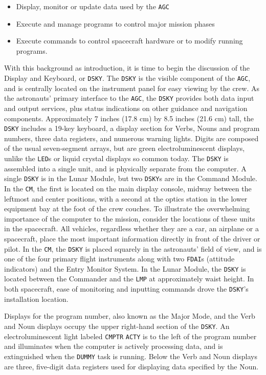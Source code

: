 \documentclass[refcap, oxford]{ahsan}
\begin{document}
\begin{itemize}
  \item Display, monitor or update data used by the \texttt{AGC}
  \item Execute and manage programs to control major mission phases
  \item Execute commands to control spacecraft hardware or to modify running programs.
\end{itemize}

With this background as introduction, it is time to begin the discussion of the Display and Keyboard, or \texttt{DSKY}. The \texttt{DSKY} is the visible component of the \texttt{AGC}, and is centrally located on the instrument panel for easy viewing by the crew. As the astronauts' primary interface to the \texttt{AGC}, the \texttt{DSKY} provides both data input and output services, plus status indications on other guidance and navigation components. Approximately 7 inches (17.8 cm) by 8.5 inches (21.6 cm) tall, the \texttt{DSKY} includes a 19-key keyboard, a display section for Verbs, Nouns and program numbers, three data registers, and numerous warning lights. Digits are composed of the usual seven-segment arrays, but are green electroluminescent displays, unlike the \texttt{LED}s or liquid crystal displays so common today. The \texttt{DSKY} is assembled into a single unit, and is physically separate from the computer. A single \texttt{DSKY} is in the Lunar Module, but two \texttt{DSKY}s are in the Command Module. In the \texttt{CM}, the first is located on the main display console, midway between the leftmost and center positions, with a second at the optics station in the lower equipment bay at the foot of the crew couches. To illustrate the overwhelming importance of the computer to the mission, consider the locations of these units in the spacecraft. All vehicles, regardless whether they are a car, an airplane or a spacecraft, place the most important information directly in front of the driver or pilot. In the \texttt{CM}, the \texttt{DSKY} is placed squarely in the astronauts' field of view, and is one of the four primary flight instruments along with two \texttt{FDAI}s (attitude indicators) and the Entry Monitor System. In the Lunar Module, the \texttt{DSKY} is located between the Commander and the \texttt{LMP} at approximately waist height. In both spacecraft, ease of monitoring and inputting commands drove the \texttt{DSKY}'s installation location.

Displays for the program number, also known as the Major Mode, and the Verb and Noun displays occupy the upper right-hand section of the \texttt{DSKY}. An electroluminescent light labeled \texttt{CMPTR} \texttt{ACTY} is to the left of the program number and illuminates when the computer is actively processing data, and is extinguished when the \texttt{DUMMY} task is running. Below the Verb and Noun displays are three, five-digit data registers used for displaying data specified by the Noun.
\end{document}
